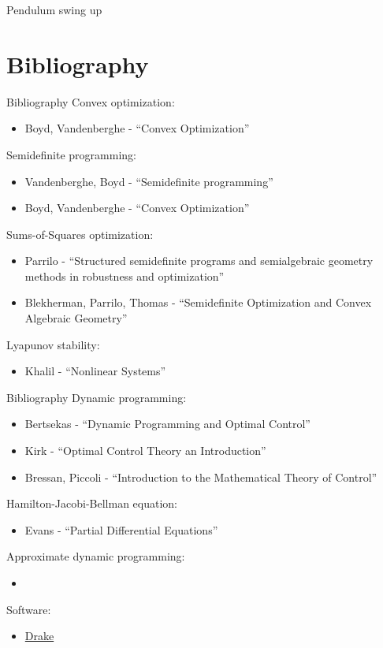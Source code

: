 \documentclass[aspectratio=169]{beamer}
\begin{document}
\begin{frame}{Pendulum swing up}
	
\end{frame}

\section{Bibliography}
\begin{frame}{Bibliography}
\footnotesize
Convex optimization:
\begin{itemize}
\item
Boyd, Vandenberghe - ``Convex Optimization''
\end{itemize}
Semidefinite programming:
\begin{itemize}
\item
Vandenberghe, Boyd - ``Semidefinite programming''
\item
Boyd, Vandenberghe - ``Convex Optimization''
\end{itemize}
Sums-of-Squares optimization:
\begin{itemize}
\item
Parrilo - ``Structured semidefinite programs and semialgebraic geometry methods in robustness and optimization''
\item
Blekherman, Parrilo, Thomas - ``Semidefinite Optimization and Convex Algebraic Geometry''
\end{itemize}
Lyapunov stability:
\begin{itemize}
\item
Khalil - ``Nonlinear Systems''
\end{itemize}
\end{frame}

\begin{frame}{Bibliography}
\footnotesize
Dynamic programming:
\begin{itemize}
\item
Bertsekas - ``Dynamic Programming and Optimal Control''
\item
Kirk - ``Optimal Control Theory an Introduction''
\item
Bressan, Piccoli - ``Introduction to the Mathematical Theory of Control''
\end{itemize}
Hamilton-Jacobi-Bellman equation:
\begin{itemize}
\item
Evans - ``Partial Differential Equations''
\end{itemize}
Approximate dynamic programming:
\begin{itemize}
\item
\end{itemize}
Software:
\begin{itemize}
\item
\href{https://drake.mit.edu}{{\color{blue}Drake}}
\end{itemize}
\end{frame}
\end{document}
